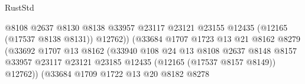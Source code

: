 \begin{lexlean}{RustStd}
\begin{coremodule}
                                                    @8108
                                                    @2637
                                                    @8130
                                                    @8138
                                                    @33957
                                                    @23117
                                                    @23121
                                                    @23155
                                                    @12435
                                                    (@12165 (@17537 @8138 @8131))
                                                    @12762))
                                                (@33684
                                                  @1707
                                                  @1723
                                                  @13
                                                  @21
                                                  @8162
                                                  @8279
                                                  (@33692
                                                    @1707
                                                    @13
                                                    @8162
                                                    (@33940
                                                      @108
                                                      @24
                                                      @13
                                                      @8108
                                                      @2637
                                                      @8148
                                                      @8157
                                                      @33957
                                                      @23117
                                                      @23121
                                                      @23185
                                                      @12435
                                                      (@12165 (@17537 @8157 @8149))
                                                      @12762))
                                                  (@33684
                                                    @1709
                                                    @1722
                                                    @13
                                                    @20
                                                    @8182
                                                    @8278

\end{coremodule}
\end{lexlean}

